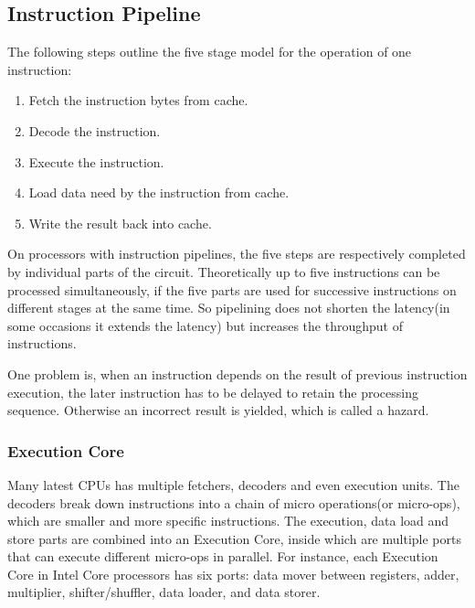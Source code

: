 \documentclass[a4paper]{report}
\begin{document}
\subsection{Instruction Pipeline} \indent

	The following steps outline the five stage model for the operation of one instruction:
	
	\begin{enumerate}
		\item Fetch the instruction bytes from cache.
		\item Decode the instruction.
		\item Execute the instruction.
		\item Load data need by the instruction from cache.
		\item Write the result back into cache.
	\end{enumerate}

	On processors with instruction pipelines, the five steps are respectively completed by individual parts of the circuit. Theoretically up to five instructions can be processed simultaneously, if the five parts are used for successive instructions on different stages at the same time. So pipelining does not shorten the latency(in some occasions it extends the latency) but increases the throughput of instructions.


	One problem is, when an instruction depends on the result of previous instruction execution, the later instruction has to be delayed to retain the processing sequence. Otherwise an incorrect result is yielded, which is called a hazard.

\subsubsection{Execution Core} \indent

	Many latest CPUs has multiple fetchers, decoders and even execution units. The decoders break down instructions into a chain of micro operations(or micro-ops), which are smaller and more specific instructions. The execution, data load and store parts are combined into an Execution Core, inside which are multiple ports that can execute different micro-ops in parallel. For instance, each Execution Core in Intel Core processors has six ports: data mover between registers, adder, multiplier, shifter/shuffler, data loader, and data storer. \cite{intelopt} %
\end{document}
